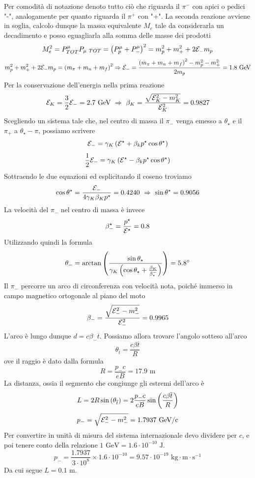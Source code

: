 \documentclass[12pt,twoside,a4]{article}
\begin{document}
\newpage
\begin{solution}
Per comodità  di notazione denoto tutto ciò che riguarda il $\pi^-$ con apici o pedici "-", analogamente per quanto riguarda il $\pi^+$ con "+".
La seconda reazione avviene in soglia, calcolo dunque la massa equivalente $M_e$ tale da considerarla un decadimento e posso eguagliarla alla somma delle masse dei prodotti
$$ M_e^2 = P^\mu_{TOT} P_{\mu \mbox{ } TOT} = \left({P^\mu_p + P^\mu_-}\right)^2 = m_p^2 + m_+^2 +2 \mathcal{E}_- m_p$$ 
$$ m_p^2 + m_+^2 +2 \mathcal{E}_- m_p = \left({m_\pi + m_n + m_f}\right)^2  \Rightarrow  \mathcal{E}_- = \frac{\left({m_\pi + m_n + m_f}\right)^2 - m_p^2 - m_+^2 }{2 m_p} = 1.8 \mbox{ GeV}$$
Per la conservazione dell'energia nella prima reazione
$$ \mathcal{E}_K = \frac{3}{2} \mathcal{E}_- = 2.7 \mbox{ GeV}  \  \Rightarrow  \  \beta_K = \frac{\sqrt{\mathcal{E}_K^2 - m_K^2}}{\mathcal{E}_K^2} = 0.9827$$
Scegliendo un sistema tale che, nel centro di massa il $\pi_-$ venga emesso a $\theta_\star$ e il $\pi_+$ a $\theta_\star - \pi$, possiamo scrivere
$$ \mathcal{E}_- = \gamma_K \left({ \mathcal{E}^\star + \beta_k p^\star \cos \theta^\star}\right)$$
$$ \frac{1}{2} \mathcal{E}_- = \gamma_K \left({ \mathcal{E}^\star - \beta_k p^\star \cos \theta^\star}\right)$$
Sottraendo le due equazioni ed esplicitando il coseno troviamo
$$ \cos \theta^\star = \frac{\mathcal{E}_-}{4 \gamma_K \beta_K p^\star} = 0.4240  \  \Rightarrow  \  \sin \theta^\star = 0.9056$$
La velocità  del $\pi_-$ nel centro di massa è invece
$$ \beta^\star_- = \frac{p^\star}{\mathcal{E}^\star} = 0.8 $$
Utilizzando quindi la formula 
$$ \theta_{-} = \arctan\left({\frac{\sin\theta_\star}{\gamma_K \left({ \cos \theta_\star + \frac{\beta_K}{\beta_\star^-}}\right)}}\right) = 5.8^\circ$$
Il $\pi_-$ percorre un arco di circonferenza con velocità  nota, poiché immerso in campo magnetico ortogonale al piano del moto
$$ \beta_- = \frac{\sqrt{\mathcal{E}_-^2 - m_-^2}}{\mathcal{E}_-^2} = 0.9965 $$
L'arco è lungo dunque $d = c \beta_- \overline{t}$. Possiamo allora trovare l'angolo sotteso all'arco
$$ \theta_{\overline{t}} = \frac{c \beta \overline{t}}{R}$$
ove il raggio è dato dalla formula
$$ R = \frac{p_- c}{e B} = 17.9 \mbox{ m}$$
La distanza, ossia il segmento che congiunge gli estremi dell'arco è
$$ L  = 2 R \sin \left({\theta_{\overline{t}}}\right) = 2 \frac{p_- c}{e B} \sin \left({\frac{c \beta \overline{t}}{R}}\right)$$
$$ p_- = \sqrt{\mathcal{E}^2_- - m^2_-} = 1.7937 \mbox{ GeV/c} $$
Per convertire in unità  di misura del sistema internazionale devo dividere per $c$, e poi tenere conto della relazione $1 \mbox{ GeV} = 1.6 \cdot 10^{-10} \mbox{ J}$. 
$$ p_- = \frac{1.7937}{3 \cdot 10^8 } \times 1.6 \cdot 10^{-10}=  9.57 \cdot 10^{-19} \mbox{ kg}\cdot \mbox{m} \cdot \mbox{s}^{-1} $$
Da cui segue $L = 0.1 \mbox{ m}$.
\end{solution}
\end{document}
